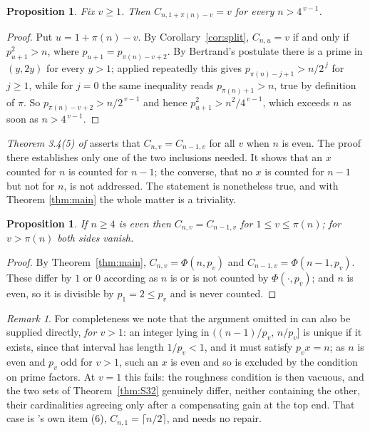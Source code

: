 \documentclass[a4paper,11pt,oneside,reqno]{amsart}
\theoremstyle{definition}
\theoremstyle{remark}
\newtheorem{remark}[definition]{Remark}
\theoremstyle{plain}
\newtheorem{proposition}[definition]{Proposition}
\begin{document}
\begin{proposition}\label{prop:fixed344}
  Fix \(v \ge 1\). Then \(C_{n,1+\pi(n)-v} = v\) for every \(n > 4^{\,v-1}\).
\end{proposition}

\begin{proof}
  Put \(u = 1+\pi(n)-v\). By Corollary~\ref{cor:split}, \(C_{n,u} = v\) if and only
  if \(p_{u+1}^{2} > n\), where \(p_{u+1} = p_{\pi(n)-v+2}\). By Bertrand's postulate
  there is a prime in \((y,2y)\) for every \(y > 1\); applied repeatedly this
  gives \(p_{\pi(n)-j+1} > n/2^{\,j}\) for \(j \ge 1\), while for \(j = 0\) the same
  inequality reads \(p_{\pi(n)+1} > n\), true by definition of \(\pi\). So
  \(p_{\pi(n)-v+2} > n/2^{\,v-1}\) and hence \(p_{u+1}^{2} > n^{2}/4^{\,v-1}\), which
  exceeds \(n\) as soon as \(n > 4^{\,v-1}\).
\end{proof}

\emph{Theorem 3.4(5) of \cite{Snellman2000}} asserts that \(C_{n,v} = C_{n-1,v}\)
for all \(v\) when \(n\) is even. The proof there establishes only one of the two
inclusions needed. It shows that an \(x\) counted for \(n\) is counted for
\(n-1\); the converse, that no \(x\) is counted for \(n-1\) but not for \(n\),
is not addressed. The statement is nonetheless true, and with Theorem
\ref{thm:main} the whole matter is a triviality.

\begin{proposition}\label{prop:fixed345}
  If \(n \ge 4\) is even then \(C_{n,v} = C_{n-1,v}\) for \(1 \le v \le \pi(n)\); for
  \(v > \pi(n)\) both sides vanish.
\end{proposition}

\begin{proof}
  By Theorem~\ref{thm:main}, \(C_{n,v} = \Phi(n,p_v)\) and
  \(C_{n-1,v} = \Phi(n-1,p_v)\). These differ by \(1\) or \(0\) according as
  \(n\) is or is not counted by \(\Phi(\cdot,p_v)\); and \(n\) is even, so it
  is divisible by \(p_1 = 2 \le p_v\) and is never counted.
\end{proof}

\begin{remark}
  For completeness we note that the argument omitted in \cite{Snellman2000} can
  also be supplied directly, \emph{for \(v > 1\)}: an integer lying in
  \(((n-1)/p_v,\,n/p_v]\) is unique if it exists, since that interval has length
  \(1/p_v < 1\), and it must satisfy \(p_vx = n\); as \(n\) is even and \(p_v\) odd
  for \(v > 1\), such an \(x\) is even and so is excluded by the condition on
  prime factors. At \(v = 1\) this fails: the roughness condition is then vacuous,
  and the two sets of Theorem~\ref{thm:S32} genuinely differ, neither containing
  the other, their cardinalities agreeing only after a compensating gain at the
  top end. That case is \cite{Snellman2000}'s own item (6),
  \(C_{n,1} = \lceil n/2\rceil\), and needs no repair.
\end{remark}
\end{document}
